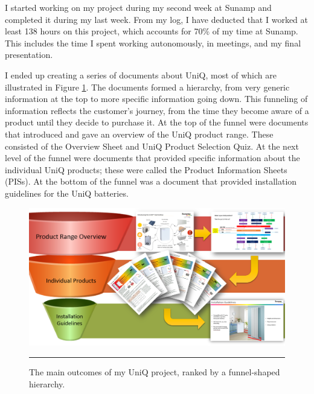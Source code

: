 
I started working on my project during my second week at Sunamp and completed it during my last week.
From my log, I have deducted that I worked at least 138 hours on this project, which accounts for 70\% of my time at Sunamp.
This includes the time I spent working autonomously, in meetings, and my final presentation.

I ended up creating a series of documents about UniQ, most of which are illustrated in Figure \ref{funnel}.
The documents formed a hierarchy, from very generic information at the top to more specific information going down.
This funneling of information reflects the customer's journey, from the time they become aware of a product until they decide to purchase it.
At the top of the funnel were documents that introduced and gave an overview of the UniQ product range.
These consisted of the Overview Sheet and UniQ Product Selection Quiz.
At the next level of the funnel were documents that provided specific information about the individual UniQ products; these were called the Product Information Sheets (PISs).
At the bottom of the funnel was a document that provided installation guidelines for the UniQ batteries.


\begin{figure}[htbp]
	\centering
	\includegraphics[width=\textwidth]{figures/Funnel.PNG}
	\rule{\textwidth}{0.5pt} %
	\caption{The main outcomes of my UniQ project, ranked by a funnel-shaped hierarchy.}
	\label{funnel}
\end{figure}


